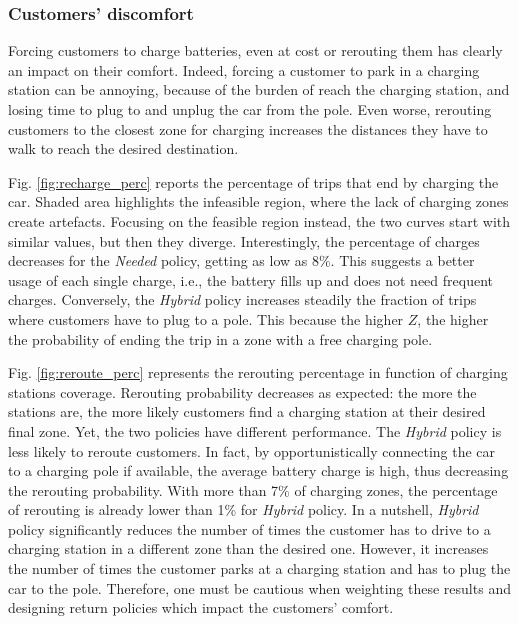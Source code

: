 \subsubsection{Customers' discomfort}

Forcing customers to charge batteries, even at cost or rerouting them has clearly an impact on their comfort. Indeed, forcing a customer to park in a charging station can be annoying, because of the burden of reach the charging station, and losing time to plug to and unplug the car from the pole. Even worse, rerouting customers to the closest zone for charging increases the distances they have to walk to reach the desired destination. 

Fig. \ref{fig:recharge_perc} reports the percentage of trips that end by charging the car. Shaded area highlights the infeasible region, where the lack of charging zones create artefacts. Focusing on the feasible region instead, the two curves start with similar values, but then they diverge. Interestingly, the percentage of charges decreases for the \textit{Needed} policy, getting as low as 8\%. This suggests a better usage of each single charge, i.e., the battery fills up and does not need frequent charges. 
Conversely, the \textit{Hybrid} policy increases steadily the fraction of trips where customers have to plug to a pole. This because the higher $Z$, the higher the probability of ending the trip in a zone with a free charging pole.

Fig. \ref{fig:reroute_perc} represents the rerouting percentage in function of charging stations coverage.
Rerouting probability decreases as expected: the more the stations are, the more likely customers find a charging station at their desired final zone. Yet, the two policies have different performance. The \textit{Hybrid} policy is less likely to reroute customers. In fact, by opportunistically connecting the car to a charging pole if available, the average battery charge is high, thus decreasing the rerouting probability. With more than 7\% of charging zones, the percentage of rerouting is already lower than 1\% for \textit{Hybrid} policy.
In a nutshell, \textit{Hybrid} policy significantly reduces the number of times the customer has to drive to a charging station in a different zone than the desired one. However, it increases the number of times the customer parks at a charging station and has to plug the car to the pole. Therefore, one must be cautious when weighting these results and designing return policies which impact the customers' comfort. 

